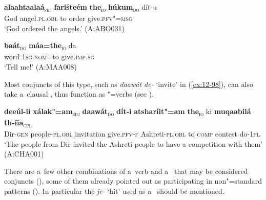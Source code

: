 \begin{exe}
\begin{exe}
\ex
\label{ex:12-96}
\gll {\ob}\textbf{alaahtaalaá}{\cb}\textsubscript{\textsc{\upshape sbj}} {\ob}\textbf{farišteém} \textbf{the}{\cb}\textsubscript{\textsc{\upshape io}} {\ob}\textbf{húkum}{\cb}\textsubscript{\textsc{\upshape do}} dít-u\\
God angel.\textsc{pl.obl} to order give.\textsc{pfv"=msg}\\
\glt `God ordered the angels.' (A:ABO031)
\end{exe}
\begin{exe}
\ex
\label{ex:12-97}
\gll {\ob}\textbf{baát}{\cb}\textsubscript{\textsc{\upshape do}} {\ob}\textbf{máa=the}{\cb}\textsubscript{\textsc{\upshape io}} da\\
word \textsc{1sg.nom=}to give.\textsc{imp.sg}\\
\glt `Tell me!' (A:MAA008)
\end{exe}

Most conjuncts of this type, such as \textit{daawát de-} `invite' in (\ref{ex:12-98}), can also take a~clausal , thus function as "=verbs (see ).

\begin{exe}
\ex
\label{ex:12-98}
\gll {\ob}\textbf{deeúl-ii} \textbf{xálak"=am}{\cb}\textsubscript{\textsc{\upshape sbj}} {\ob}\textbf{daawát}{\cb}\textsubscript{\textsc{\upshape do}} {\ob}\textbf{dít-i}{\cb} {\ob}\textbf{atsharíit"=am} \textbf{the}{\cb}\textsubscript{\textsc{\upshape io}} ki {\ob}\textbf{muqaabilá} \textbf{th-íia}{\cb}\textsubscript{\textsc{\upshape cpl}}\\
Dir-\textsc{gen} people-\textsc{pl.obl} invitation give.\textsc{pfv-f}  Ashreti-\textsc{pl.obl} to \textsc{comp} contest do-\textsc{1pl}\\
\glt `The people from Dir invited the Ashreti people to have a competition with them' (A:CHA001)
\end{exe}

 There are a~few other combinations of a~verb and a~ that may be considered conjuncts (), some of them already pointed out as participating in non"=standard  patterns (). In particular the  \textit{ǰe-} `hit' used as a~ should be mentioned.



\end{exe}
